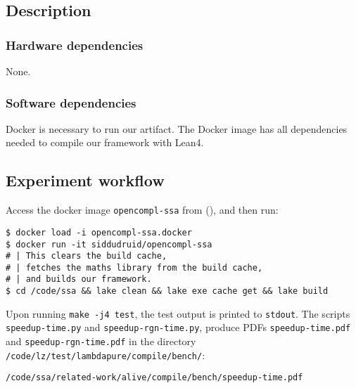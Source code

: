 \documentclass{sigplanconf}
\begin{document}
\subsection{Description}

\subsubsection{Hardware dependencies}

None.

\subsubsection{Software dependencies}

Docker is necessary to run our artifact. The Docker image has all dependencies needed to compile our framework with Lean4.



\subsection{Experiment workflow}

Access the docker image \texttt{opencompl-ssa} from (\ourdoi{}), and then run:

\begin{verbatim}
$ docker load -i opencompl-ssa.docker
$ docker run -it siddudruid/opencompl-ssa
# | This clears the build cache,
# | fetches the maths library from the build cache,
# | and builds our framework.
$ cd /code/ssa && lake clean && lake exe cache get && lake build
\end{verbatim}


Upon running \texttt{make -j4 test}, the test output is printed to \texttt{stdout}.
The scripts \texttt{speedup-time.py} and \texttt{speedup-rgn-time.py},
produce PDFs \texttt{speedup-time.pdf} and \texttt{speedup-rgn-time.pdf}
in the directory \texttt{/code/lz/test/lambdapure/compile/bench/}:

\begin{verbatim}
/code/ssa/related-work/alive/compile/bench/speedup-time.pdf
\end{verbatim}
\end{document}
